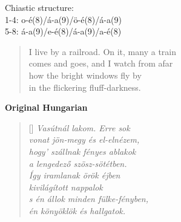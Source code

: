 \documentclass[a4paper,12pt,twoside,final]{book}
\begin{document}
\noindent Chiastic structure: \\
1-4: o-é(8)/á-a(9)/ö-é(8)/á-a(9) \\
5-8: á-a(9)/e-é(8)/á-a(9)/a-é(8)

\newpage


\settowidth{\versewidth}{}

\begin{verse}%
  I live by a railroad. On it, many a train \\
  comes and goes, and I watch from afar \\
  how the bright windows fly by \\
  in the flickering fluff-darkness. \\
\end{verse}

\newpage


\noindent \textbf{Original Hungarian}



\settowidth{\versewidth}{s én állok minden fülke-fényben,}

\begin{verse}[\versewidth]
  \it
  Vasútnál lakom. Erre sok \\
  vonat jön-megy és el-elnézem, \\
  hogy' szállnak fényes ablakok \\
  a lengedező szösz-sötétben. \\
  Így iramlanak örök éjben \\
  kivilágított nappalok \\
  s én állok minden fülke-fényben, \\
  én könyöklök és hallgatok. \\
\end{verse}
\end{document}
